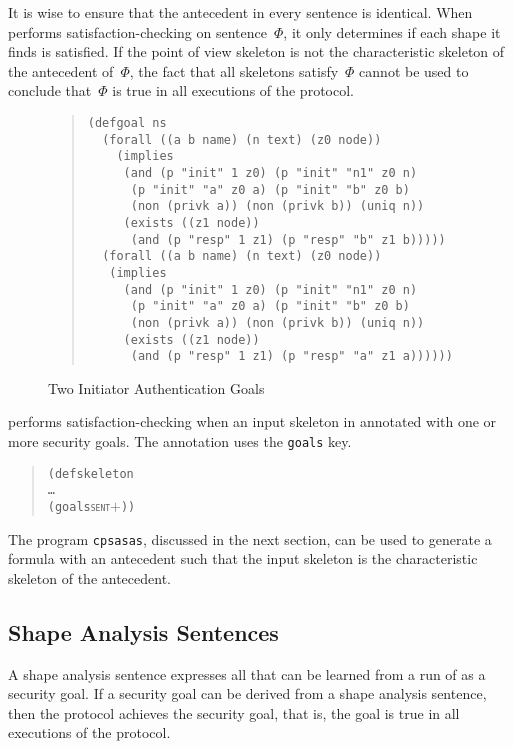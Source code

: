 \documentclass[12pt]{article}
\begin{document}
It is wise to ensure that the antecedent in every sentence is
identical.  When {\cpsa} performs satisfaction-checking on
sentence~$\Phi$, it only determines if each shape it finds is
satisfied.  If the point of view skeleton is not the characteristic
skeleton of the antecedent of~$\Phi$, the fact that all skeletons
satisfy~$\Phi$ cannot be used to conclude that~$\Phi$ is true in all
executions of the protocol.

\begin{figure}
\begin{quote}
\begin{verbatim}
(defgoal ns
  (forall ((a b name) (n text) (z0 node))
    (implies
     (and (p "init" 1 z0) (p "init" "n1" z0 n)
      (p "init" "a" z0 a) (p "init" "b" z0 b)
      (non (privk a)) (non (privk b)) (uniq n))
     (exists ((z1 node))
      (and (p "resp" 1 z1) (p "resp" "b" z1 b)))))
  (forall ((a b name) (n text) (z0 node))
   (implies
     (and (p "init" 1 z0) (p "init" "n1" z0 n)
      (p "init" "a" z0 a) (p "init" "b" z0 b)
      (non (privk a)) (non (privk b)) (uniq n))
     (exists ((z1 node))
      (and (p "resp" 1 z1) (p "resp" "a" z1 a))))))
\end{verbatim}
\end{quote}
\caption{Two Initiator Authentication Goals}\label{fig:ns init goals}
\end{figure}

{\cpsa} performs satisfaction-checking when an input skeleton in annotated
with one or more security goals.  The annotation uses the
\texttt{goals} key.

\begin{quote}
  \begin{alltt}
(defskeleton
   \ldots
   (goals \textsc{sent\ensuremath{+}}))
  \end{alltt}
\end{quote}

The program \texttt{cpsasas}, discussed in the next section, can be
used to generate a formula with an antecedent such that the input
skeleton is the characteristic skeleton of the antecedent.

\subsection{Shape Analysis Sentences}\label{sec:sas}

A shape analysis sentence expresses all that can be learned from a run
of {\cpsa} as a security goal.  If a security goal can be derived from
a shape analysis sentence, then the protocol achieves the security
goal, that is, the goal is true in all executions of the protocol.
\end{document}

